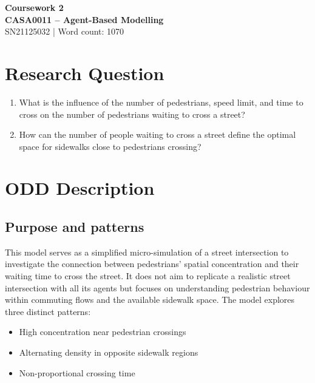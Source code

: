 \documentclass[10pt]{report}
\author{Felipe Santos Almeida}
\numberwithin{figure}{section}
\numberwithin{table}{section}
\begin{document}

\begin{center}
    \vspace*{-3cm}
\end{center}   
    {\LARGE\textbf{Coursework 2\\
    CASA0011 – Agent-Based Modelling\\}}
SN21125032 | Word count: 1070

\vspace{5mm} %
  
\section{Research Question}

\begin{enumerate}
    \item  What is the influence of the number of pedestrians, speed limit, and time to cross on the number of pedestrians waiting to cross a street?
    \item How can the number of people waiting to cross a street define the optimal space for sidewalks close to pedestrians crossing?
\end{enumerate}

\section{ODD Description}
\subsection{Purpose and patterns}

This model serves as a simplified micro-simulation of a street intersection to investigate the connection between pedestrians' spatial concentration and their waiting time to cross the street. It does not aim to replicate a realistic street intersection with all its agents but focuses on understanding pedestrian behaviour within commuting flows and the available sidewalk space.
The model explores three distinct patterns:
\begin{itemize}
    \item High concentration near pedestrian crossings
    \item Alternating density in opposite sidewalk regions
    \item Non-proportional crossing time
\end{itemize}
\end{document}
